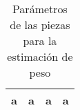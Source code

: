 \begin{center}
	\begin{table}[H]
		\caption{Parámetros de las piezas para la estimación de peso}
		\label{tab:listadoPiezas:param_impresion}
		\begin{minipage}{\textwidth}
			\begin{tabular}{ |c|c|c|c| }
				\hline
				a & a & a & a \\ 
				\hline
			\end{tabular}
		\end{minipage}
	\end{table}
\end{center}
